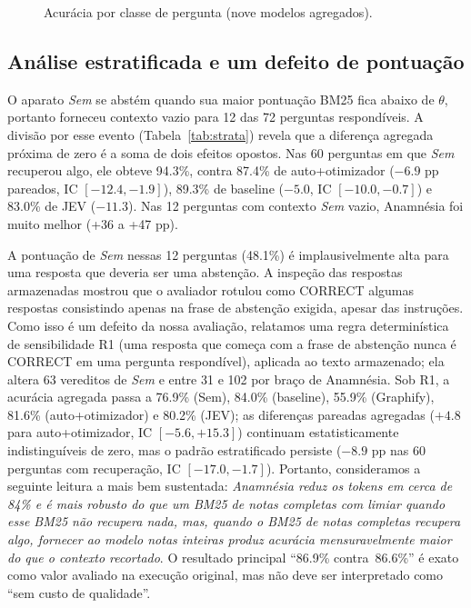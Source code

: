 \documentclass[conference,onecolumn,11pt]{IEEEtran}
\newcommand{\anam}{Anam\-n\'esia}
\begin{document}


\begin{figure}[!htbp]\centering
{}
\caption{Acurácia por classe de pergunta (nove modelos agregados).}\label{fig:class}
\end{figure}



\subsection{Análise estratificada e um defeito de pontuação}\label{sec:strata}
O aparato \emph{Sem} se abstém quando sua maior pontuação BM25 fica abaixo de $\theta$, portanto forneceu contexto vazio para 12 das 72 perguntas respondíveis. A divisão por esse evento (Tabela~\ref{tab:strata}) revela que a diferença agregada próxima de zero é a soma de dois efeitos opostos. Nas 60 perguntas em que \emph{Sem} recuperou algo, ele obteve 94.3\%, contra 87.4\% de auto+otimizador ($-6.9$ pp pareados, IC $[-12.4,-1.9]$), 89.3\% de baseline ($-5.0$, IC $[-10.0,-0.7]$) e 83.0\% de JEV ($-11.3$). Nas 12 perguntas com contexto \emph{Sem} vazio, \anam{} foi muito melhor (+36 a +47 pp).

A pontuação de \emph{Sem} nessas 12 perguntas (48.1\%) é implausivelmente alta para uma resposta que deveria ser uma abstenção. A inspeção das respostas armazenadas mostrou que o avaliador rotulou como CORRECT algumas respostas consistindo apenas na frase de abstenção exigida, apesar das instruções. Como isso é um defeito da nossa avaliação, relatamos uma regra determinística de sensibilidade R1 (uma resposta que começa com a frase de abstenção nunca é CORRECT em uma pergunta respondível), aplicada ao texto armazenado; ela altera 63 vereditos de \emph{Sem} e entre 31 e 102 por braço de \anam{}. Sob R1, a acurácia agregada passa a 76.9\% (Sem), 84.0\% (baseline), 55.9\% (Graphify), 81.6\% (auto+otimizador) e 80.2\% (JEV); as diferenças pareadas agregadas ($+4.8$ para auto+otimizador, IC $[-5.6,+15.3]$) continuam estatisticamente indistinguíveis de zero, mas o padrão estratificado persiste ($-8.9$ pp nas 60 perguntas com recuperação, IC $[-17.0,-1.7]$). Portanto, consideramos a seguinte leitura a mais bem sustentada: \emph{\anam{} reduz os tokens em cerca de 84\% e é mais robusto do que um BM25 de notas completas com limiar quando esse BM25 não recupera nada, mas, quando o BM25 de notas completas recupera algo, fornecer ao modelo notas inteiras produz acurácia mensuravelmente maior do que o contexto recortado}. O resultado principal ``86.9\% contra\ 86.6\%'' é exato como valor avaliado na execução original, mas não deve ser interpretado como ``sem custo de qualidade''.
\end{document}
